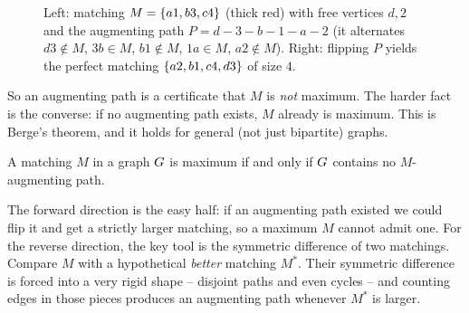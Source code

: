 \begin{figure}[H]
\centering
{}
\caption{Left: matching $M=\{a1,b3,c4\}$ (thick red) with free vertices
$d,2$ and the augmenting path $P=d\!-\!3\!-\!b\!-\!1\!-\!a\!-\!2$ (it alternates
$d3\notin M$, $3b\in M$, $b1\notin M$, $1a\in M$, $a2\notin M$). Right: flipping
$P$ yields the perfect matching $\{a2,b1,c4,d3\}$ of size $4$.}
\label{ch15:fig-augment}
\end{figure}

So an augmenting path is a certificate that $M$ is \emph{not} maximum. The harder
fact is the converse: if no augmenting path exists, $M$ already is maximum. This
is Berge's theorem, and it holds for general (not just bipartite) graphs.

\begin{theorem}[Berge, 1957]
\label{ch15:thm-berge}
A matching $M$ in a graph $G$ is maximum if and only if $G$ contains no
$M$-augmenting path.
\end{theorem}

\begin{whybox}
The forward direction is the easy half: if an augmenting path existed we could
flip it and get a strictly larger matching, so a maximum $M$ cannot admit one.
For the reverse direction, the key tool is the
symmetric difference of two matchings. Compare $M$ with a hypothetical
\emph{better} matching $M^\ast$. Their symmetric difference is forced into a very
rigid shape -- disjoint paths and even cycles -- and counting edges in those
pieces produces an augmenting path whenever $M^\ast$ is larger.
\end{whybox}

